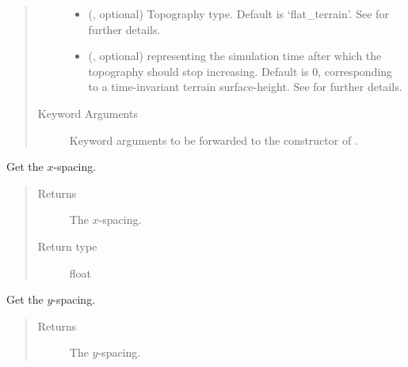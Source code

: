 \documentclass[letterpaper,10pt,english]{sphinxmanual}
\begin{document}
\begin{fulllineitems}
\begin{fulllineitems}
\begin{quote}
\begin{description}
\begin{itemize}
\item {} 
 (, optional) \textendash{} Topography type. Default is ‘flat\_terrain’. See {\hyperref[\detokenize{api:module-grids.topography}]{}} for further details.

\item {} 
 (, optional) \textendash{}  representing the simulation time after which the topography should stop
increasing. Default is 0, corresponding to a time-invariant terrain surface-height. See
{\hyperref[\detokenize{api:module-grids.topography}]{}} for further details.

\end{itemize}

\item[{Keyword Arguments}] \leavevmode
{} \textendash{} Keyword arguments to be forwarded to the constructor of {\hyperref[\detokenize{api:grids.topography.Topography2d}]{}}.

\end{description}\end{quote}

\end{fulllineitems}


\begin{fulllineitems}
\label{\detokenize{api:grids.grid_xyz.GridXYZ.dx}}
Get the \(x\)-spacing.
\begin{quote}\begin{description}
\item[{Returns}] \leavevmode
The \(x\)-spacing.

\item[{Return type}] \leavevmode
float

\end{description}\end{quote}

\end{fulllineitems}


\begin{fulllineitems}
\label{\detokenize{api:grids.grid_xyz.GridXYZ.dy}}
Get the \(y\)-spacing.
\begin{quote}\begin{description}
\item[{Returns}] \leavevmode
The \(y\)-spacing.


\end{description}
\end{quote}
\end{fulllineitems}
\end{fulllineitems}
\end{document}
